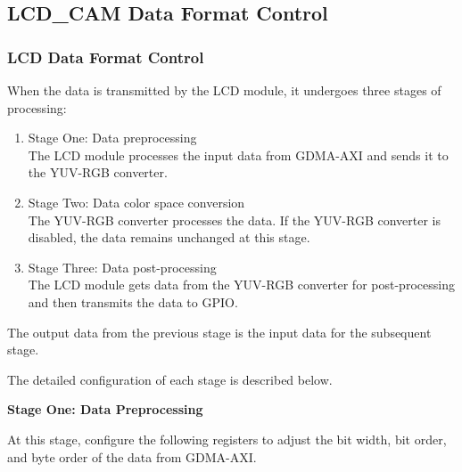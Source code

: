 \documentclass[main\_\_EN.tex]{subfiles}
\begin{document}
\subsection{LCD\_CAM Data Format Control}
\subsubsection{LCD Data Format Control} \label{lcd_data_control}

When the data is transmitted by the LCD module, it undergoes three stages of processing:

\begin{enumerate}
    \item Stage One: Data preprocessing\\
   The LCD module processes the input data from GDMA-AXI and sends it to the YUV-RGB converter.
    \item Stage Two: Data color space conversion\\
    The YUV-RGB converter processes the data. If the YUV-RGB converter is disabled, the data remains unchanged at this stage.
    \item Stage Three: Data post-processing\\
    The LCD module gets data from the YUV-RGB converter for post-processing and then transmits the data to GPIO.
\end{enumerate}

\begin{tiplisting}
    The output data from the previous stage is the input data for the subsequent stage.
\end{tiplisting}

The detailed configuration of each stage is described below.

\textbf{Stage One: Data Preprocessing}

At this stage, configure the following registers to adjust the bit width, bit order, and byte order of the data from GDMA-AXI.
\end{document}
